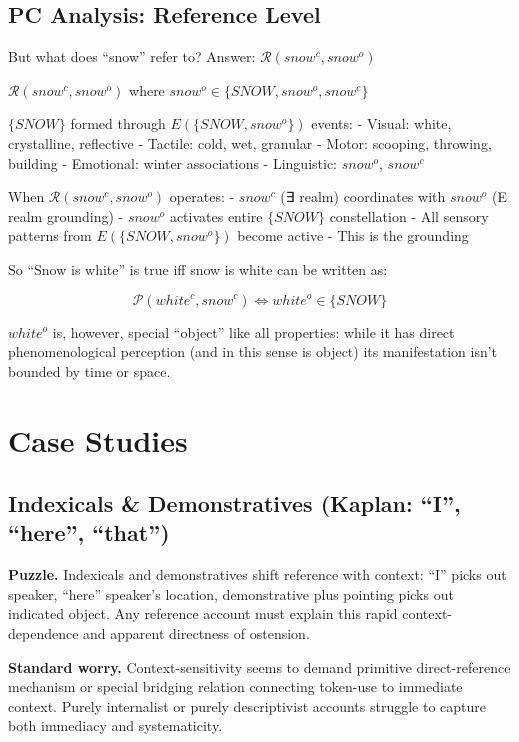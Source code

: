 \documentclass[12pt]{article}
\begin{document}
\subsection{PC Analysis: Reference Level}\label{pc-analysis-reference-level}

But what does ``snow'' refer to? Answer: \(\mathcal{R}(snow^c, snow^o)\)

\(\mathcal{R}(snow^c, snow^o)\) where \(snow^o \in \{SNOW, snow^o, snow^c\}\)

\(\{SNOW\}\) formed through \(E(\{SNOW, snow^o\})\) events: - Visual: white, crystalline, reflective - Tactile: cold, wet, granular - Motor: scooping, throwing, building - Emotional: winter associations - Linguistic: \(snow^o\), \(snow^c\)

When \(\mathcal{R}(snow^c, snow^o)\) operates: - \(snow^c\) (∃ realm) coordinates with \(snow^o\) (E realm grounding) - \(snow^o\) activates entire \(\{SNOW\}\) constellation - All sensory patterns from \(E(\{SNOW, snow^o\})\) become active - This is the grounding

So ``Snow is white'' is true iff snow is white can be written as:

\[\mathcal{P}(white^c, snow^c) \iff white^o \in \{SNOW\}\]

\(white^o\) is, however, special ``object'' like all properties: while it has direct phenomenological perception (and in this sense is object) its manifestation isn't bounded by time or space.

\section{Case Studies}\label{case-studies}

\subsection{Indexicals \& Demonstratives (Kaplan: ``I'', ``here'', ``that'')}\label{indexicals-demonstratives-kaplan-i-here-that}

\textbf{Puzzle.} Indexicals and demonstratives shift reference with context: ``I'' picks out speaker, ``here'' speaker's location, demonstrative plus pointing picks out indicated object. Any reference account must explain this rapid context-dependence and apparent directness of ostension.

\textbf{Standard worry.} Context-sensitivity seems to demand primitive direct-reference mechanism or special bridging relation connecting token-use to immediate context. Purely internalist or purely descriptivist accounts struggle to capture both immediacy and systematicity.
\end{document}
